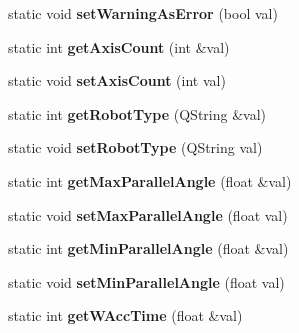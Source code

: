 \begin{DoxyCompactItemize}
\item 
\hypertarget{classRobotConf_a57275a345994bf6179e88651a886e20a}{static void {\bfseries set\-Warning\-As\-Error} (bool val)}\label{classRobotConf_a57275a345994bf6179e88651a886e20a}

\item 
\hypertarget{classRobotConf_ae944a61aac3145b72c3d44feeb55109f}{static int {\bfseries get\-Axis\-Count} (int \&val)}\label{classRobotConf_ae944a61aac3145b72c3d44feeb55109f}

\item 
\hypertarget{classRobotConf_a4982230d0004d11704795c0de1b8bee3}{static void {\bfseries set\-Axis\-Count} (int val)}\label{classRobotConf_a4982230d0004d11704795c0de1b8bee3}

\item 
\hypertarget{classRobotConf_ae3c6c81c1d3f97e61afa73e773c3616a}{static int {\bfseries get\-Robot\-Type} (Q\-String \&val)}\label{classRobotConf_ae3c6c81c1d3f97e61afa73e773c3616a}

\item 
\hypertarget{classRobotConf_a819e4fc23319bee3c2ced246a42f7987}{static void {\bfseries set\-Robot\-Type} (Q\-String val)}\label{classRobotConf_a819e4fc23319bee3c2ced246a42f7987}

\item 
\hypertarget{classRobotConf_a5f5c47ec203c3ba4e87ea592b9ce2dae}{static int {\bfseries get\-Max\-Parallel\-Angle} (float \&val)}\label{classRobotConf_a5f5c47ec203c3ba4e87ea592b9ce2dae}

\item 
\hypertarget{classRobotConf_a0a88218e441982f02d5852bfcd047b95}{static void {\bfseries set\-Max\-Parallel\-Angle} (float val)}\label{classRobotConf_a0a88218e441982f02d5852bfcd047b95}

\item 
\hypertarget{classRobotConf_a3bb675829f75f447ba2272203c08a2f8}{static int {\bfseries get\-Min\-Parallel\-Angle} (float \&val)}\label{classRobotConf_a3bb675829f75f447ba2272203c08a2f8}

\item 
\hypertarget{classRobotConf_a74f36b2bccc47740d9739d08a792fe41}{static void {\bfseries set\-Min\-Parallel\-Angle} (float val)}\label{classRobotConf_a74f36b2bccc47740d9739d08a792fe41}

\item 
\hypertarget{classRobotConf_a4f130869d996fbbcfe4c6342c7bc3512}{static int {\bfseries get\-W\-Acc\-Time} (float \&val)}\label{classRobotConf_a4f130869d996fbbcfe4c6342c7bc3512}


\end{DoxyCompactItemize}
